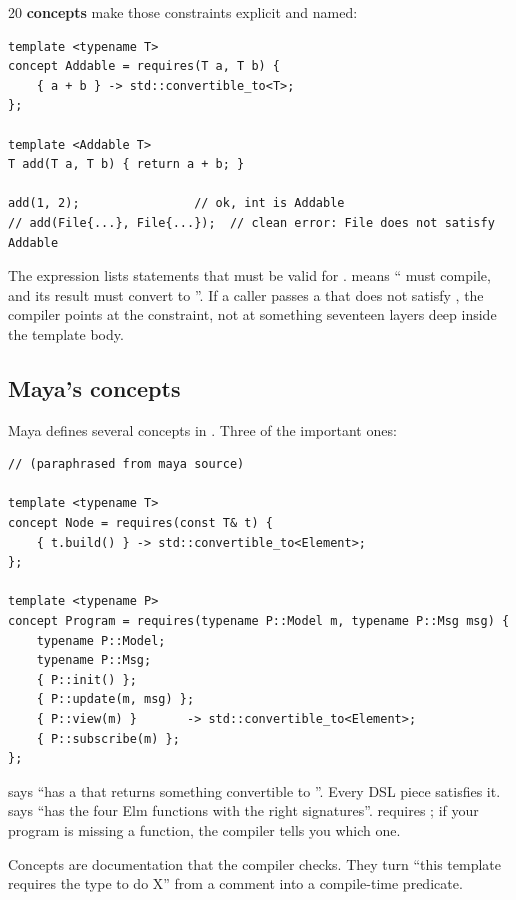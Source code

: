 \cpp{}20 \textbf{concepts} make those constraints explicit and
named:

\begin{lstlisting}
template <typename T>
concept Addable = requires(T a, T b) {
    { a + b } -> std::convertible_to<T>;
};

template <Addable T>
T add(T a, T b) { return a + b; }

add(1, 2);                // ok, int is Addable
// add(File{...}, File{...});  // clean error: File does not satisfy Addable
\end{lstlisting}

The  expression lists statements that must be valid
for .  means
`` must compile, and its result must convert to
''. If a caller passes a  that does not satisfy
, the compiler points at the constraint, not at
something seventeen layers deep inside the template body.

\subsection{Maya's concepts}

Maya defines several concepts in . Three of
the important ones:

\begin{lstlisting}
// (paraphrased from maya source)

template <typename T>
concept Node = requires(const T& t) {
    { t.build() } -> std::convertible_to<Element>;
};

template <typename P>
concept Program = requires(typename P::Model m, typename P::Msg msg) {
    typename P::Model;
    typename P::Msg;
    { P::init() };
    { P::update(m, msg) };
    { P::view(m) }       -> std::convertible_to<Element>;
    { P::subscribe(m) };
};
\end{lstlisting}

 says ``has a  that returns something
convertible to ''. Every DSL piece satisfies it.
 says ``has the four Elm functions with the right
signatures''.  requires ; if your
program is missing a function, the compiler tells you which one.

\begin{idea}
Concepts are documentation that the compiler checks. They turn
``this template requires the type to do X'' from a comment into a
compile-time predicate.
\end{idea}

